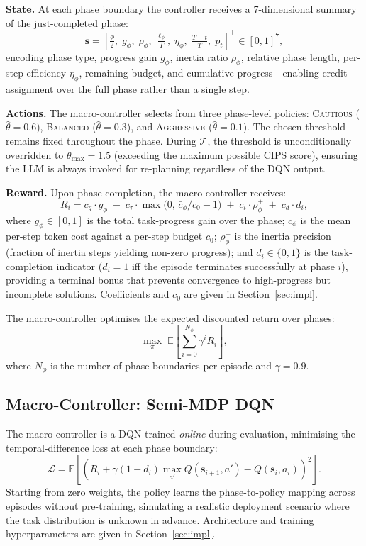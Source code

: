 \documentclass[runningheads]{llncs}
\begin{document}
\textbf{State.} At each phase boundary the controller receives a 7-dimensional summary of the just-completed phase:
$$\mathbf{s} = \left[\tfrac{\phi}{2},\; g_\phi,\; \rho_\phi,\; \tfrac{\ell_\phi}{T},\; \eta_\phi,\; \tfrac{T-t}{T},\; p_t\right]^\top \in [0,1]^7,$$
encoding phase type, progress gain $g_\phi$, inertia ratio $\rho_\phi$, relative phase length, per-step efficiency $\eta_\phi$, remaining budget, and cumulative progress—enabling credit assignment over the full phase rather than a single step.

\textbf{Actions.} The macro-controller selects from three phase-level policies: \textsc{Cautious} ($\hat\theta=0.6$), \textsc{Balanced} ($\hat\theta=0.3$), and \textsc{Aggressive} ($\hat\theta=0.1$).
The chosen threshold remains fixed throughout the phase.
During $\mathcal{T}$, the threshold is unconditionally overridden to $\theta_{\max}=1.5$ (exceeding the maximum possible CIPS score), ensuring the LLM is always invoked for re-planning regardless of the DQN output.

\textbf{Reward.} Upon phase completion, the macro-controller receives:
\begin{equation}
  R_i = c_g\cdot g_\phi \;-\; c_\tau\cdot\max\!\bigl(0,\,\bar{c}_\phi/c_0-1\bigr) \;+\; c_\iota\cdot\rho_\phi^{+} \;+\; c_d\cdot d_i,
  \label{eq:reward}
\end{equation}
where $g_\phi\!\in\![0,1]$ is the total task-progress gain over the phase; $\bar{c}_\phi$ is the mean per-step token cost against a per-step budget $c_0$; $\rho_\phi^{+}$ is the inertia precision (fraction of inertia steps yielding non-zero progress); and $d_i\!\in\!\{0,1\}$ is the task-completion indicator ($d_i{=}1$ iff the episode terminates successfully at phase $i$), providing a terminal bonus that prevents convergence to high-progress but incomplete solutions. Coefficients and $c_0$ are given in Section~\ref{sec:impl}.

The macro-controller optimises the expected discounted return over phases:
\begin{equation}
  \max_\pi\;\mathbb{E}\!\left[\sum_{i=0}^{N_\phi}\gamma^i R_i\right],
  \label{eq:objective}
\end{equation}
where $N_\phi$ is the number of phase boundaries per episode and $\gamma=0.9$.

\subsection{Macro-Controller: Semi-MDP DQN}
\label{sec:macro}
The macro-controller is a DQN trained \emph{online} during evaluation, minimising the temporal-difference loss at each phase boundary:
$$\mathcal{L} = \mathbb{E}\!\left[\!\left(R_i + \gamma(1-d_i)\max_{a'}Q(\mathbf{s}_{i+1},a') - Q(\mathbf{s}_i,a_i)\right)^{\!2}\right].$$
Starting from zero weights, the policy learns the phase-to-policy mapping across episodes without pre-training, simulating a realistic deployment scenario where the task distribution is unknown in advance. Architecture and training hyperparameters are given in Section~\ref{sec:impl}.
\end{document}
